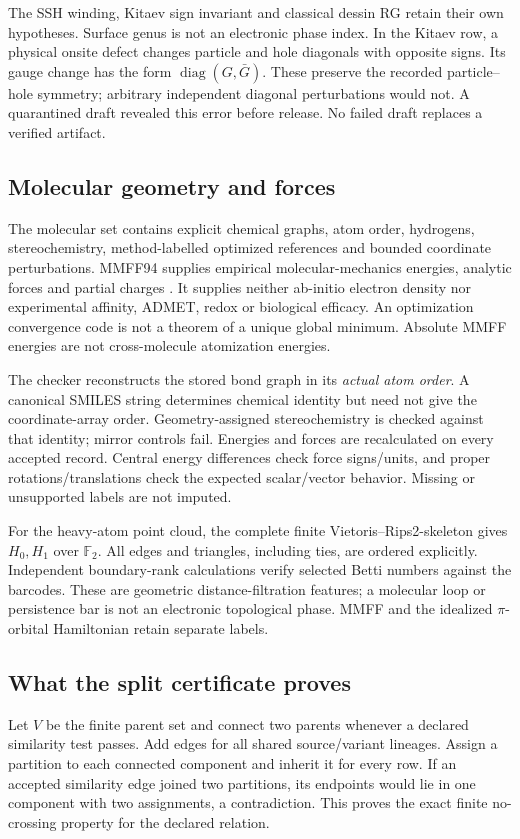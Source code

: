\documentclass[11pt]{article}
\theoremstyle{definition}\newtheorem{definition}[theorem]{Definition}
\theoremstyle{remark}\newtheorem{remark}[theorem]{Remark}
\begin{document}
The SSH winding, Kitaev sign invariant and classical dessin RG retain their
own hypotheses. Surface genus is not an electronic phase index. In the
Kitaev row, a physical onsite defect changes particle and hole diagonals with
opposite signs. Its gauge change has the form $\operatorname{diag}(G,\bar G)$.
These preserve the recorded particle--hole symmetry; arbitrary independent
diagonal perturbations would not. A quarantined draft revealed this error
before release. No failed draft replaces a verified artifact.

\subsection{Molecular geometry and forces}
The molecular set contains explicit chemical graphs, atom order, hydrogens,
stereochemistry, method-labelled optimized references and bounded coordinate
perturbations. MMFF94 supplies empirical molecular-mechanics energies, analytic
forces and partial charges \cite{DSRDKit}. It supplies neither ab-initio
electron density nor experimental affinity, ADMET, redox or biological efficacy.
An optimization convergence code is not a theorem of a unique global minimum.
Absolute MMFF energies are not cross-molecule atomization energies.

The checker reconstructs the stored bond graph in its \emph{actual atom order}.
A canonical SMILES string determines chemical identity but need not give the
coordinate-array order. Geometry-assigned stereochemistry is checked against
that identity; mirror controls fail. Energies and forces are recalculated on
every accepted record. Central energy differences check force signs/units,
and proper rotations/translations check the expected scalar/vector behavior.
Missing or unsupported labels are not imputed.

For the heavy-atom point cloud, the complete finite Vietoris--Rips2-skeleton
gives $H_0,H_1$ over $\mathbb F_2$. All edges and triangles, including ties,
are ordered explicitly. Independent boundary-rank calculations verify selected
Betti numbers against the barcodes. These are geometric distance-filtration
features; a molecular loop or persistence bar is not an electronic topological
phase. MMFF and the idealized $\pi$-orbital Hamiltonian retain separate labels.

\subsection{What the split certificate proves}
Let $V$ be the finite parent set and connect two parents whenever a declared
similarity test passes. Add edges for all shared source/variant lineages.
Assign a partition to each connected component and inherit it for every row.
If an accepted similarity edge joined two partitions, its endpoints would lie
in one component with two assignments, a contradiction. This proves the exact
finite no-crossing property for the declared relation.
\end{document}
